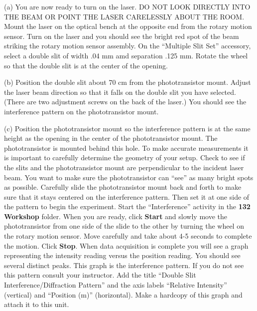 (a) You are now ready to turn on the laser. DO NOT LOOK DIRECTLY INTO
THE BEAM OR POINT THE LASER CARELESSLY ABOUT THE ROOM. Mount the laser on the 
optical bench at the opposite end from the rotary motion sensor. Turn on the
laser and you should see the bright red spot of the beam striking
the rotary motion sensor assembly. On the ``Multiple Slit Set'' accessory, 
select a double slit of width .04 mm amd separation .125 mm. Rotate the 
wheel so that the double slit is at the center of the opening.
\vspace{10mm}

(b) Position the double slit about 70 cm from the phototransistor mount. Adjust 
the laser beam direction so that it falls on the double slit you have selected. 
(There are two adjustment screws on the back of the laser.) 
You should see the interference pattern on the phototransistor mount. 
\vspace{10mm}

(c) Position the phototransistor mount so the interference pattern
is at the same height as the opening in the center of the phototransistor mount. The phototransistor is mounted behind this hole. To make accurate measurements it is important to carefully determine the geometry of your setup. Check to see if the slits and the phototransistor mount are perpendicular to the incident
laser beam.  You want to make sure the phototransistor can {}``see'' as many
bright spots as possible. Carefully slide the phototransistor mount back and forth to make sure that it stays centered on the interference pattern. Then set it 
at one side of the pattern to begin the experiment.
Start the ``Interference'' activity in the {\bf 132 Workshop} folder. 
When you are ready, click {\bf Start} and slowly move the phototransistor 
from one side of the slide to the other by turning the wheel on the rotary 
motion sensor. Move carefully and take about 4-5 seconds to complete the 
motion. Click {\bf Stop}.
When data acquisition is complete you will see a graph representing
the intensity reading versus the position reading. You should see
several distinct peaks. This graph is the interference pattern. If
you do not see this pattern consult your instructor. Add the title ``Double 
Slit Interference/Diffraction Pattern'' and the axis labels ``Relative 
Intensity'' (vertical) and ``Position (m)'' (horizontal). Make a hardcopy
of this graph and attach it to this unit.


